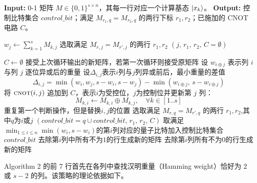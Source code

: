 \documentclass[10.5pt,compsoc,UTF8]{CjC}
\theoremstyle{mystyle}
\begin{document}
\begin{algorithm}[H]
\caption{多控G门控制比特选择与预合并非零相位确立}
\begin{algorithmic}[1]
\State \textbf{Input:} 0-1 矩阵 $M \in \{0,1\}^{s \times n}$，其每一行对应一个计算基态 $\ket{x_k}$。
\State \textbf{Output:} 控制比特集合 $control\_bit$；满足 $M_{r_1,q}=M_{r_2,q}$ 的两行下标 $r_1,r_2$；已施加的 CNOT 电路 $C$。

    \State $w_j \gets \sum_{k=1}^{s} M_{k,j}$  
        \State 选取满足 $M_{r,j}=M_{r',j}$ 的两行 $r_1,r_2$ 
        \State \Return $(j,\, r_1,\, r_2,\, C = \emptyset)$
    \EndIf
\EndFor

\State $C \gets \emptyset$  
\State 接受上次循环输出的新矩阵，若第一次循环则接受原矩阵
\State 设 $w_{i\oplus j}$ 表示列 $i$ 与列 $j$ 逐位异或后的重量
    \State 设$\Delta_{i,j}$表示$i$列与$j$列异或前后，最小重量的差值
    $$
        \Delta_{i,j} = \min(w_i,w_j,s-w_i,s-w_j) - \min(w_{i\oplus j},\, s-w_{i\oplus j})
    $$
    \State 将 $\textsc{cnot}(i,j)$ 追加到 $C$，表示$i$为受控位，$j$为控制位并更新第 $j$ 列：
    \[
        M_{k,i} \gets M_{k,i} \oplus M_{k,j}, \quad \forall k \in [1..s]
    \]
    \State 重复第一个判断操作，但是替换$i,j$的位置
    \EndIf
        \State 选取满足 $M_{r,q}=M_{r',q}$ 的两行 $r_1,r_2$,其中$q$为$i$或$j$
        \State \Return $(control\_bit=q \cup control\_bit,\, r_1,\, r_2,\, C)$
    \EndIf
    \EndFor
    \EndFor
    \State 取满足$\min_{1 \le i \le n} \min(w_i, s - w_i)$的第$i$列对应的量子比特加入控制比特集合 $control\_bit$
     去除第$i$列中所有不为$1$的行生成新的矩阵
    \Else 去除第$i$列所有不为$0$的行生成新的矩阵
    \EndIf
\EndWhile
\end{algorithmic}
\end{algorithm}

Algorithm 2 的前 7 行首先在各列中查找汉明重量（Hamming weight）恰好为 $2$ 或 $s-2$ 的列。该策略的理论依据如下。
\end{document}
